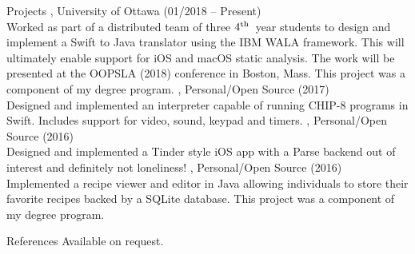 \documentclass{resume}
\newcommand{\fourth}{$4^{\mbox{\scriptsize th}}$\ }
\begin{document}



\begin{category}{Projects}
, University of Ottawa (01/2018 -- Present)\\
Worked as part of a distributed team of three \fourth year students to
design and implement a Swift to Java translator using the IBM WALA framework.
This will ultimately enable support for iOS and macOS static analysis.
The work will be presented at the OOPSLA (2018) conference in Boston, Mass.
This project was a component of my degree program.
, Personal/Open Source (2017)\\
Designed and implemented an interpreter capable of running CHIP-8 programs in Swift.
Includes support for video, sound, keypad and timers.
, Personal/Open Source (2016)\\
Designed and implemented a Tinder style iOS app with a Parse backend out of interest and 
definitely not loneliness!
, Personal/Open Source (2016)\\
Implemented a recipe viewer and editor in Java allowing individuals to store their
favorite recipes backed by a SQLite database.
This project was a component of my degree program.
\end{category}


\begin{category}{References}
\citemnobullet Available on request.
\end{category}
\end{document}
